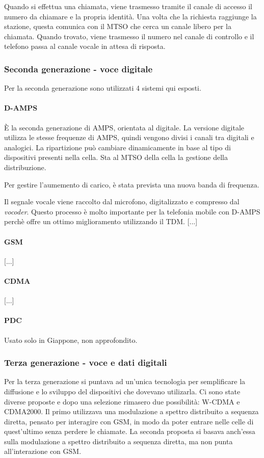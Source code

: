Quando si effettua una chiamata, viene trasmesso tramite il canale di accesso il numero da chiamare e la propria identità.
Una volta che la richiesta raggiunge la stazione, questa comunica con il MTSO che cerca un canale libero per la chiamata.
Quando trovato, viene trasmesso il numero nel canale di controllo e il telefono passa al canale vocale in attesa di risposta.

\subsubsection{Seconda generazione - voce digitale}
Per la seconda generazione sono utilizzati 4 sistemi qui esposti.

\paragraph{D-AMPS}
\`E la seconda generazione di AMPS, orientata al digitale. 
La versione digitale utilizza le stesse frequenze di AMPS, quindi vengono divisi i canali tra digitali e analogici.
La ripartizione può cambiare dinamicamente in base al tipo di dispositivi presenti nella cella. 
Sta al MTSO della cella la gestione della distribuzione.

Per gestire l'aumemento di carico, è stata prevista una nuova banda di frequenza. 

Il segnale vocale viene raccolto dal microfono, digitalizzato e compresso dal \textit{vocoder}.
Questo processo è molto importante per la telefonia mobile con D-AMPS perchè offre un ottimo miglioramento utilizzando il TDM. 
[...]

\paragraph{GSM}
[...]

\paragraph{CDMA}
[...]

\paragraph{PDC}
Usato solo in Giappone, non approfondito.

\subsubsection{Terza generazione - voce e dati digitali}
Per la terza generazione si puntava ad un'unica tecnologia per semplificare la diffusione e lo sviluppo del dispositivi che dovevano utilizarla.
Ci sono state diverse proposte e dopo una selezione rimasero due possibilità: W-CDMA e CDMA2000.
Il primo utilizzava una modulazione a spettro distribuito a sequenza diretta, pensato per interagire con GSM, in modo da poter entrare nelle celle di quest'ultimo senza perdere le chiamate.
La seconda proposta si basava anch'essa sulla modulazione a spettro distribuito a sequenza diretta, ma non punta all'interazione con GSM. 

